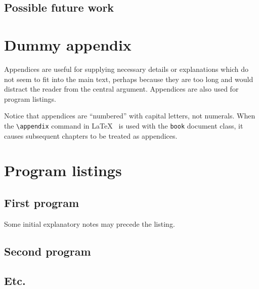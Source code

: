 \documentclass[12pt,openany,a4paper]{book}
\begin{document}
\section{Possible future work}

\appendix


\newpage
{}
\mbox{}
\newpage



\chapter{Dummy appendix}

Appendices are useful for supplying necessary details or explanations
which do not seem to fit into the main text, perhaps because they are
too long and would distract the reader from the central argument.
Appendices are also used for program listings.

Notice that appendices are ``numbered'' with capital letters, not
numerals.  When the \verb+\appendix+ command in
\LaTeX~\cite[p.\,175]{lamport} is used with the \texttt{book} document
class, it causes subsequent chapters to be treated as appendices.

\chapter{Program listings}

\section{First program}

Some initial explanatory notes may precede the listing.

\section{Second program}

\section{Etc.}
\end{document}
